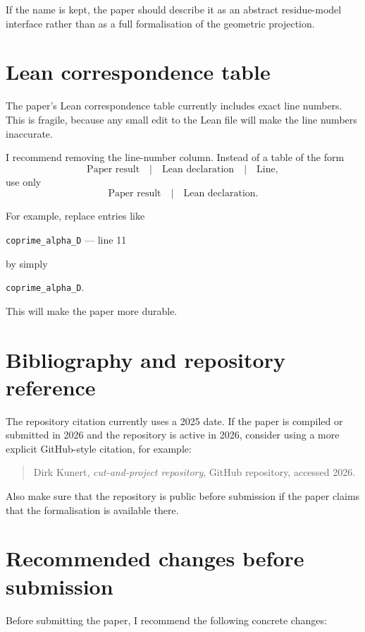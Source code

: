 \documentclass[11pt]{article}
\begin{document}
If the name is kept, the paper should describe it as an abstract residue-model
interface rather than as a full formalisation of the geometric projection.

\section{Lean correspondence table}

The paper's Lean correspondence table currently includes exact line numbers.
This is fragile, because any small edit to the Lean file will make the line
numbers inaccurate.

I recommend removing the line-number column.  Instead of a table of the form
\[
\text{Paper result} \quad | \quad \text{Lean declaration} \quad | \quad
\text{Line},
\]
use only
\[
\text{Paper result} \quad | \quad \text{Lean declaration}.
\]

For example, replace entries like
\begin{center}
\texttt{coprime\_alpha\_D} --- line 11
\end{center}
by simply
\begin{center}
\texttt{coprime\_alpha\_D}.
\end{center}

This will make the paper more durable.

\section{Bibliography and repository reference}

The repository citation currently uses a 2025 date.  If the paper is compiled
or submitted in 2026 and the repository is active in 2026, consider using a
more explicit GitHub-style citation, for example:

\begin{quote}
Dirk Kunert, \emph{cut-and-project repository}, GitHub repository, accessed
2026.
\end{quote}

Also make sure that the repository is public before submission if the paper
claims that the formalisation is available there.

\section{Recommended changes before submission}

Before submitting the paper, I recommend the following concrete changes:
\end{document}
